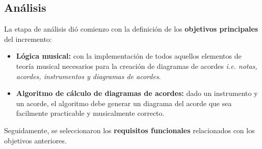 \subsection{Análisis}

La etapa de análisis dió comienzo con la definición de los \textbf{objetivos principales} del incremento:

\begin{itemize}
    \item \textbf{Lógica musical:} con la implementación de todos aquellos elementos de teoría musical necesarios para la creación de diagramas de acordes \textit{i.e. notas, acordes, instrumentos y diagramas de acordes}.
    \item \textbf{Algoritmo de cálculo de diagramas de acordes:} dado un instrumento y un \gls{acorde}, el algoritmo debe generar un diagrama del acorde que sea facilmente practicable y musicalmente correcto. 
\end{itemize}

Seguidamente, se seleccionaron los \textbf{requisitos funcionales}  relacionados con los objetivos anteriores.

